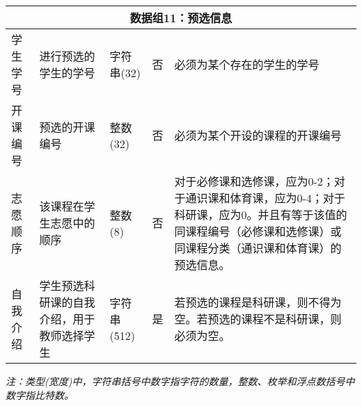 \begin{center}
\begin{longtable}{p{6em}p{16em}p{8em}p{2em}p{16em}}
        \multicolumn{5}{c}{\textbf{数据组11：预选信息}} \\
        \midrule
        学生学号 & 进行预选的学生的学号 & 字符串(32) & 否 & 必须为某个存在的学生的学号 \\
        开课编号 & 预选的开课编号 & 整数(32) & 否 & 必须为某个开设的课程的开课编号 \\
        志愿顺序 & 该课程在学生志愿中的顺序 & 整数(8) & 否 & 对于必修课和选修课，应为0-2；对于通识课和体育课，应为0-4；对于科研课，应为0。并且有等于该值的同课程编号（必修课和选修课）或同课程分类（通识课和体育课）的预选信息。\\
        自我介绍 & 学生预选科研课的自我介绍，用于教师选择学生 & 字符串(512) & 是 & 若预选的课程是科研课，则不得为空。若预选的课程不是科研课，则必须为空。 \\
    \end{longtable}
    \textit{注：类型(宽度)中，字符串括号中数字指字符的数量，整数、枚举和浮点数括号中数字指比特数。}
\end{center}
